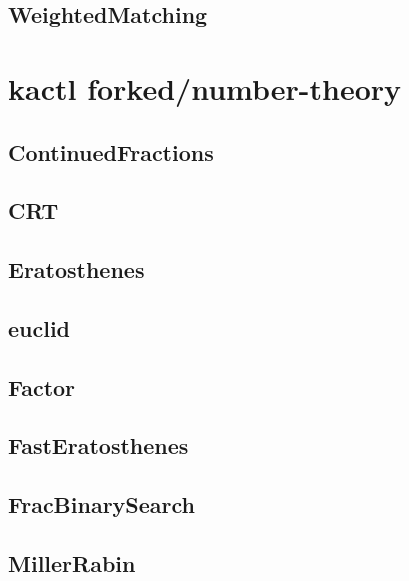 \subsection{WeightedMatching}
\raggedbottom
\hrulefill

\section{kactl forked/number-theory}
\subsection{ContinuedFractions}
\raggedbottom
\hrulefill
\subsection{CRT}
\raggedbottom
\hrulefill
\subsection{Eratosthenes}
\raggedbottom
\hrulefill
\subsection{euclid}
\raggedbottom
\hrulefill
\subsection{Factor}
\raggedbottom
\hrulefill
\subsection{FastEratosthenes}
\raggedbottom
\hrulefill
\subsection{FracBinarySearch}
\raggedbottom
\hrulefill
\subsection{MillerRabin}
\raggedbottom
\hrulefill

